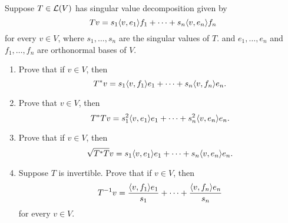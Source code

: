 \begin{exercise}{17}
  Suppose $T\in\mathcal{L}(V)$ has singular value decomposition given by 
  \[
  Tv =s_1\langle v,e_1\rangle f_1+\dots+s_n\langle v,e_n\rangle f_n
  \]
  for every $v\in V$, where $s_1,\dots,s_n$ are the singular values of $T$. and $e_1,\dots,e_n$ and $f_1,\dots,f_n$ are orthonormal bases of $V$.
  \begin{enumerate}
      \item Prove that if $v\in V$, then
      \[
      T^\ast v =s_1\langle v,f_1\rangle e_1+\dots+s_n\langle v,f_n\rangle e_n.
      \]
      \item Prove that $v\in V$, then
      \[
      T^\ast Tv =s_1^2\langle v,e_1\rangle e_1+\dots+s_n^2\langle v,e_n\rangle e_n.
      \]
      \item Prove that if $v\in V$, then
      \[
      \sqrt{T^\ast T}v =s_1\langle v,e_1\rangle e_1+\dots+s_n\langle v,e_n\rangle e_n.
      \]
      \item Suppose $T$ is invertible. Prove that if $v\in V$, then 
      \[
      T^{-1}v =\frac{\langle v,f_1\rangle e_1}{s_1}+\dots+\frac{\langle v,f_n\rangle e_n}{s_n}
      \]
      for every $v\in V$.
  \end{enumerate}
\end{exercise}
